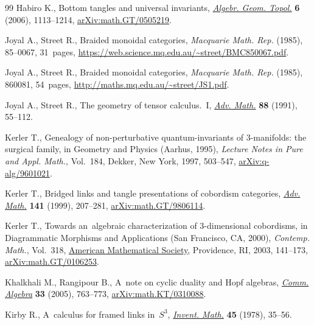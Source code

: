 \documentclass[pdftex]{sigma}
\numberwithin{equation}{section}
\begin{document}
\begin{thebibliography}{99}
Habiro K., Bottom tangles and universal invariants,
 \href{https://doi.org/10.2140/agt.2006.6.1113}{\textit{Algebr. Geom. Topol.}}
 \textbf{6} (2006), 1113--1214,
 \href{http://arxiv.org/abs/math.GT/0505219}{arXiv:math.GT/0505219}.

Joyal A., Street R., Braided monoidal categories, \textit{Macquarie Math. Rep.}
 (1985), 85--0067, 31~pages,
 \url{https://web.science.mq.edu.au/~street/BMC850067.pdf}.

Joyal A., Street R., Braided monoidal categories, \textit{Macquarie Math. Rep.}
 (1985), 860081, 54~pages, \url{http://maths.mq.edu.au/~street/JS1.pdf}.

Joyal A., Street R., The geometry of tensor calculus.~{I},
 \href{https://doi.org/10.1016/0001-8708(91)90003-P}{\textit{Adv. Math.}}
 \textbf{88} (1991), 55--112.

Kerler T., Genealogy of non-perturbative quantum-invariants of {$3$}-manifolds:
 the surgical family, in Geometry and Physics ({A}arhus, 1995),
 \textit{Lecture Notes in Pure and Appl. Math.}, Vol.~184, Dekker, New York,
 1997, 503--547,
 \href{http://arxiv.org/abs/q-alg/9601021}{arXiv:q-alg/9601021}.

Kerler T., Bridged links and tangle presentations of cobordism categories,
 \href{https://doi.org/10.1006/aima.1998.1772}{\textit{Adv. Math.}}
 \textbf{141} (1999), 207--281,
 \href{http://arxiv.org/abs/math.GT/9806114}{arXiv:math.GT/9806114}.

Kerler T., Towards an~algebraic characterization of 3-dimensional cobordisms,
 in Diagrammatic Morphisms and Applications ({S}an {F}rancisco, {CA}, 2000),
 \textit{Contemp. Math.}, Vol.~318,
 \href{https://doi.org/10.1090/conm/318/05549}{American Mathematical Society},
 Providence, RI, 2003, 141--173,
 \href{http://arxiv.org/abs/math.GT/0106253}{arXiv:math.GT/0106253}.

Khalkhali M., Rangipour B., A~note on cyclic duality and {H}opf algebras,
 \href{https://doi.org/10.1081/AGB-200051130}{\textit{Comm. Algebra}}
 \textbf{33} (2005), 763--773,
 \href{http://arxiv.org/abs/math.KT/0310088}{arXiv:math.KT/0310088}.

Kirby R., A~calculus for framed links in~{$S^{3}$},
 \href{https://doi.org/10.1007/BF01406222}{\textit{Invent. Math.}} \textbf{45}
 (1978), 35--56.


\end{thebibliography}
\end{document}

